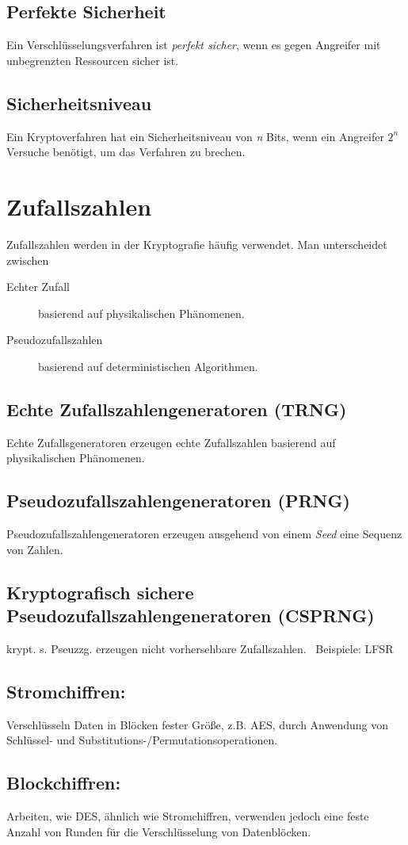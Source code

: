 \documentclass{report}
\begin{document}
\subsection{Perfekte Sicherheit}
Ein Verschlüsselungsverfahren ist \textit{perfekt sicher}, wenn es gegen Angreifer mit unbegrenzten Ressourcen sicher ist.
\subsection{Sicherheitsniveau}
Ein Kryptoverfahren hat ein Sicherheitsniveau von \textit{n} Bits, wenn ein Angreifer $2^{n}$ Versuche benötigt, um das Verfahren zu brechen.

\section{Zufallszahlen}
Zufallszahlen werden in der Kryptografie häufig verwendet. Man unterscheidet zwischen 
\begin{description}
    \item[Echter Zufall] basierend auf physikalischen Phänomenen.
    \item[Pseudozufallszahlen] basierend auf deterministischen Algorithmen.  
\end{description}
\subsection{Echte Zufallszahlengeneratoren (TRNG)}
Echte Zufallsgeneratoren erzeugen echte Zufallszahlen basierend auf physikalischen Phänomenen.
\subsection{Pseudozufallszahlengeneratoren (PRNG)}
Pseudozufallszahlengeneratoren erzeugen ausgehend von einem \textit{Seed} eine Sequenz von Zahlen.
\subsection{Kryptografisch sichere Pseudozufallszahlengeneratoren (CSPRNG)}
krypt. s. Pseuzzg. erzeugen nicht vorhersehbare Zufallszahlen. \ 
Beispiele: LFSR
\subsection{Stromchiffren:} Verschlüsseln Daten in Blöcken fester Größe, z.B. AES, durch Anwendung von Schlüssel- und Substitutions-/Permutationsoperationen.

\subsection{Blockchiffren:} Arbeiten, wie DES, ähnlich wie Stromchiffren, verwenden jedoch eine feste Anzahl von Runden für die Verschlüsselung von Datenblöcken.
\end{document}
